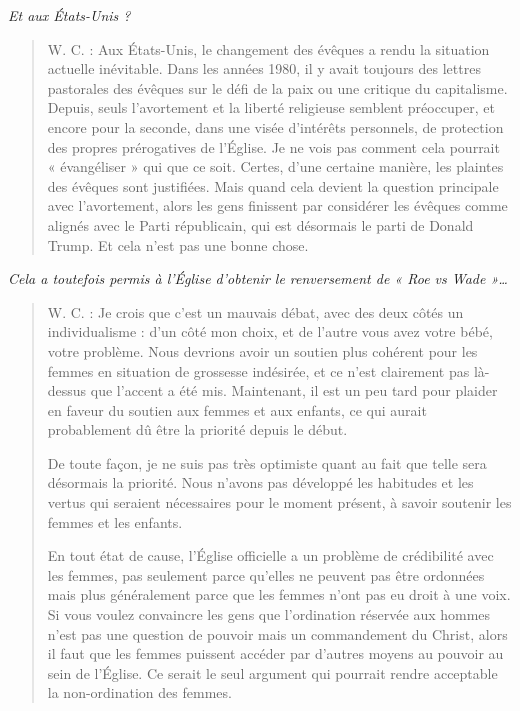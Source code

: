 \textit{
Et aux États-Unis ?
}
\begin{quote}
    
W. C. : Aux États-Unis, le changement des évêques a rendu la situation actuelle inévitable. Dans les années 1980, il y avait toujours des lettres pastorales des évêques sur le défi de la paix ou une critique du capitalisme. Depuis, seuls l’avortement et la liberté religieuse semblent préoccuper, et encore pour la seconde, dans une visée d’intérêts personnels, de protection des propres prérogatives de l’Église. Je ne vois pas comment cela pourrait « évangéliser » qui que ce soit. Certes, d’une certaine manière, les plaintes des évêques sont justifiées. Mais quand cela devient la question principale avec l’avortement, alors les gens finissent par considérer les évêques comme alignés avec le Parti républicain, qui est désormais le parti de Donald Trump. Et cela n’est pas une bonne chose.


\end{quote}
\textit{Cela a toutefois permis à l’Église d’obtenir le renversement de « Roe vs Wade »…
}

\begin{quote}
    

W. C. : Je crois que c’est un mauvais débat, avec des deux côtés un individualisme : d’un côté mon choix, et de l’autre vous avez votre bébé, votre problème. Nous devrions avoir un soutien plus cohérent pour les femmes en situation de grossesse indésirée, et ce n’est clairement pas là-dessus que l’accent a été mis. Maintenant, il est un peu tard pour plaider en faveur du soutien aux femmes et aux enfants, ce qui aurait probablement dû être la priorité depuis le début.

De toute façon, je ne suis pas très optimiste quant au fait que telle sera désormais la priorité. Nous n’avons pas développé les habitudes et les vertus qui seraient nécessaires pour le moment présent, à savoir soutenir les femmes et les enfants.
 
En tout état de cause, l’Église officielle a un problème de crédibilité avec les femmes, pas seulement parce qu’elles ne peuvent pas être ordonnées mais plus généralement parce que les femmes n’ont pas eu droit à une voix. Si vous voulez convaincre les gens que l’ordination réservée aux hommes n’est pas une question de pouvoir mais un commandement du Christ, alors il faut que les femmes puissent accéder par d’autres moyens au pouvoir au sein de l’Église. Ce serait le seul argument qui pourrait rendre acceptable la non-ordination des femmes.
\end{quote}

